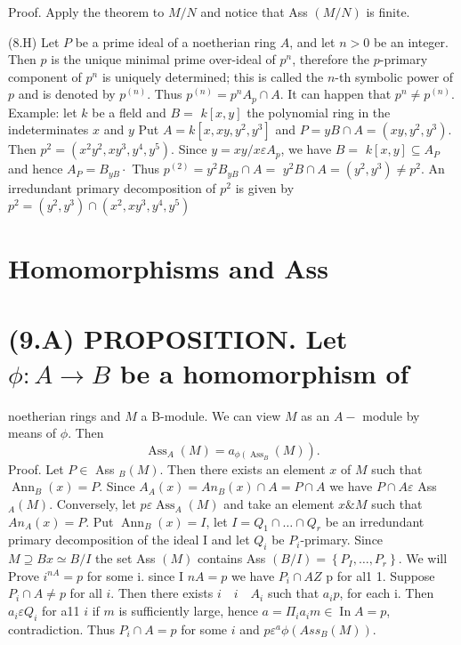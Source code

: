 Proof. Apply the theorem to $M / N$ and notice that Ass $(M / N)$ is finite.

(8.H) Let $P$ be a prime ideal of a noetherian ring $A$, and let $n>0$ be an integer. Then $p$ is the unique minimal prime over-ideal of $p^{n}$, therefore the $p$-primary component of $p^{n}$ is uniquely determined; this is called the $n$-th symbolic power of $p$ and is denoted by $p^{(n)}$. Thus $p^{(n)}=p^{n} A_{p} \cap A$. It can happen that $p^{n} \neq p^{(n)}$. Example: let $k$ be a fleld and $B=$ $k[x, y]$ the polynomial ring in the indeterminates $x$ and $y$ Put $A=k\left[x, x y, y^{2}, y^{3}\right]$ and $P=y B \cap A=\left(x y, y^{2}, y^{3}\right)$. Then $p^{2}=\left(x^{2} y^{2}, x y^{3}, y^{4}, y^{5}\right)$. Since $y=x y / x \varepsilon A_{p}$, we have $B=$ $k[x, y] \subseteq A_{P}$ and hence $A_{P}=B_{y B} \cdot$ Thus $p^{(2)}=y^{2} B_{y B} \cap A=$ $y^{2} B \cap A=\left(y^{2}, y^{3}\right) \neq p^{2}$. An irredundant primary decomposition of $p^{2}$ is given by $p^{2}=\left(y^{2}, y^{3}\right) \cap\left(x^{2}, x y^{3}, y^{4}, y^{5}\right)$

\section{Homomorphisms and Ass}
\section{(9.A) PROPOSITION. Let $\phi: A \rightarrow B$ be a homomorphism of}
noetherian rings and $M$ a B-module. We can view $M$ as an $A-$ module by means of $\phi$. Then
$$
\left.\operatorname{Ass}_{A}(M)=a_{\phi\left(\operatorname{Ass}_{B}\right.}(M)\right) .
$$
Proof. Let $P \in$ Ass $_{B}(M)$. Then there exists an element $x$ of $M$ such that $\operatorname{Ann}_{B}(x)=P$. Since $A_{A}(x)=A n_{B}(x) \cap A=P \cap A$ we have $P \cap A \varepsilon$ Ass $_{A}(M)$. Conversely, let $p \varepsilon \operatorname{Ass}_{A}(M)$ and take an element $x \& M$ such that $A n_{A}(x)=P$. Put $\operatorname{Ann}_{B}(x)=I$, let $I=Q_{1} \cap \ldots \cap Q_{r}$ be an irredundant primary decomposition of the ideal I and let $Q_{i}$ be $P_{i}$-primary. Since $M \supseteq B x \simeq B / I$ the set Ass $(M)$ contains Ass $(B / I)=\left\{P_{I}, \ldots, P_{r}\right\}$. We will Prove $i^{n A}=p$ for some i. since I $n A=p$ we have $P_{i} \cap A Z$ p for al1 1. Suppose $P_{i} \cap A \neq p$ for all $i$. Then there exists $i \quad i \quad A_{i}$ such that $a_{i} p$, for each i. Then $a_{i} \varepsilon Q_{i}$ for a11 $i$ if $m$ is sufficiently large, hence $a=\Pi_{i} a_{i} m \in \operatorname{In} A=p$, contradiction. Thus $P_{i} \cap A=p$ for some $i$ and $p \varepsilon^{a} \phi\left(A s s_{B}(M)\right)$.

